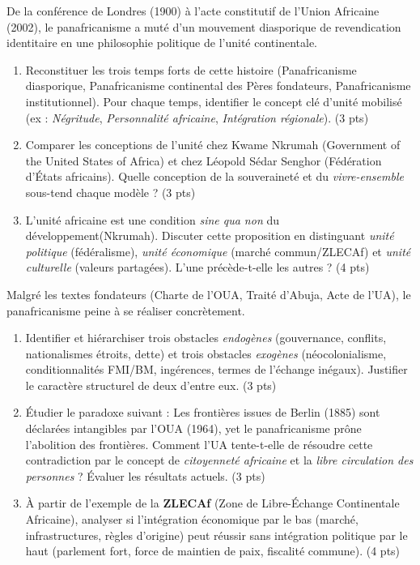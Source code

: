 \documentclass[11pt]{article}
\begin{document}
\begin{exercice}
De la conférence de Londres (1900) à l'acte constitutif de l'Union Africaine (2002), le panafricanisme a muté d'un mouvement diasporique de revendication identitaire en une philosophie politique de l'unité continentale.
\begin{enumerate}
    \item Reconstituer les trois temps forts de cette histoire (Panafricanisme diasporique, Panafricanisme continental des \og Pères fondateurs\fg{}, Panafricanisme institutionnel). Pour chaque temps, identifier le concept clé d'unité mobilisé (ex : \textit{Négritude}, \textit{Personnalité africaine}, \textit{Intégration régionale}). (3 pts)
    \item Comparer les conceptions de l'unité chez Kwame Nkrumah (\og Government of the United States of Africa\fg) et chez Léopold Sédar Senghor (\og Fédération d'États africains\fg). Quelle conception de la souveraineté et du \textit{vivre-ensemble} sous-tend chaque modèle ? (3 pts)
    \item \og L'unité africaine est une condition \textit{sine qua non} du développement\fg (Nkrumah). Discuter cette proposition en distinguant \textit{unité politique} (fédéralisme), \textit{unité économique} (marché commun/ZLECAf) et \textit{unité culturelle} (valeurs partagées). L'une précède-t-elle les autres ? (4 pts)
\end{enumerate}
\end{exercice}

\begin{exercice}
Malgré les textes fondateurs (Charte de l'OUA, Traité d'Abuja, Acte de l'UA), le panafricanisme peine à se réaliser concrètement.
\begin{enumerate}
    \item Identifier et hiérarchiser trois obstacles \textit{endogènes} (gouvernance, conflits, nationalismes étroits, dette) et trois obstacles \textit{exogènes} (néocolonialisme, conditionnalités FMI/BM, ingérences, termes de l'échange inégaux). Justifier le caractère \og structurel\fg{} de deux d'entre eux. (3 pts)
    \item Étudier le paradoxe suivant : \og Les frontières issues de Berlin (1885) sont déclarées intangibles par l'OUA (1964), yet le panafricanisme prône l'abolition des frontières\fg. Comment l'UA tente-t-elle de résoudre cette contradiction par le concept de \textit{citoyenneté africaine} et la \textit{libre circulation des personnes} ? Évaluer les résultats actuels. (3 pts)
    \item À partir de l'exemple de la \textbf{ZLECAf} (Zone de Libre-Échange Continentale Africaine), analyser si l'intégration économique \og par le bas\fg{} (marché, infrastructures, règles d'origine) peut réussir sans intégration politique \og par le haut\fg{} (parlement fort, force de maintien de paix, fiscalité commune). (4 pts)
\end{enumerate}
\end{exercice}
\end{document}

